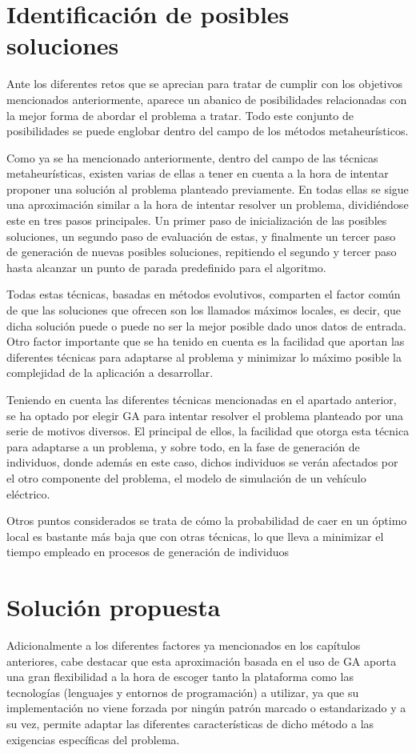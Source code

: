 \documentclass[11pt,spanish,listoffigures,listoftables]{tfgetsinf}
\begin{document}
\section{Identificación de posibles soluciones}
Ante los diferentes retos que se aprecian para tratar de cumplir con los objetivos mencionados anteriormente, aparece un abanico de posibilidades relacionadas con la mejor forma de abordar el problema a tratar. Todo este conjunto de posibilidades se puede englobar dentro del campo de los métodos metaheurísticos.

Como ya se ha mencionado anteriormente, dentro del campo de las técnicas metaheurísticas, existen varias de ellas a tener en cuenta a la hora de intentar proponer una solución al problema planteado previamente. En todas ellas se sigue una aproximación similar a la hora de intentar resolver un problema, dividiéndose este en tres pasos principales. Un primer paso de inicialización de las posibles soluciones, un segundo paso de evaluación de estas, y finalmente un tercer paso de generación de nuevas posibles soluciones, repitiendo el segundo y tercer paso hasta alcanzar un punto de parada predefinido para el algoritmo.

Todas estas técnicas, basadas en métodos evolutivos, comparten el factor común de que las soluciones que ofrecen son los llamados máximos locales, es decir, que dicha solución puede o puede no ser la mejor posible dado unos datos de entrada. Otro factor importante que se ha tenido en cuenta es la facilidad que aportan las diferentes técnicas para adaptarse al problema y minimizar lo máximo posible la complejidad de la aplicación a desarrollar.

Teniendo en cuenta las diferentes técnicas mencionadas en el apartado anterior, se ha optado por elegir GA para intentar resolver el problema planteado por una serie de motivos diversos. El principal de ellos, la facilidad que otorga esta técnica para adaptarse a un problema, y sobre todo, en la fase de generación de individuos, donde además en este caso, dichos individuos se verán afectados por el otro componente del problema, el modelo de simulación de un vehículo eléctrico.

Otros puntos considerados se trata de cómo la probabilidad de caer en un óptimo local es bastante más baja que con otras técnicas, lo que lleva a minimizar el tiempo empleado en procesos de generación de individuos

\section{Solución propuesta}
Adicionalmente a los diferentes factores ya mencionados en los capítulos anteriores, cabe destacar que esta aproximación basada en el uso de GA aporta una gran flexibilidad a la hora de escoger tanto la plataforma como las tecnologías (lenguajes y entornos de programación) a utilizar, ya que su implementación no viene forzada por ningún patrón marcado o estandarizado y a su vez, permite adaptar las diferentes características de dicho método a las exigencias específicas del problema.
\end{document}
